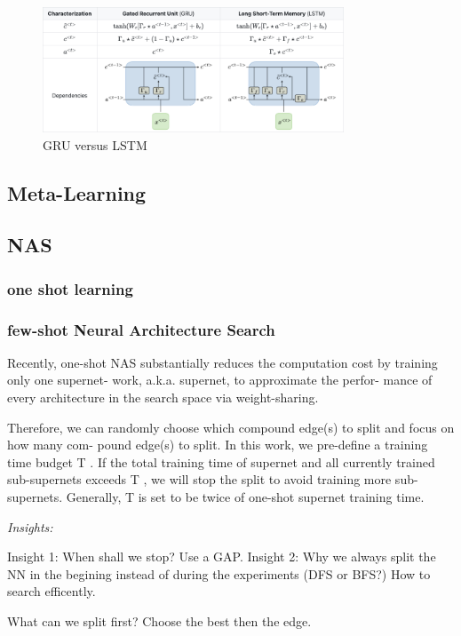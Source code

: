 \documentclass[UTF8]{article}
\begin{document}
\begin{figure}[htbp]
\caption{GRU versus LSTM}
\centering
\includegraphics[width=0.8\textwidth]{stanford.edu__shervine_teaching_cs-230_cheatsheet-recurrent-neural-networks-2.png}
\end{figure}

\subsection{Meta-Learning}
\subsection{NAS}
\subsubsection{one shot learning}

\subsubsection{few-shot Neural Architecture Search}
Recently, one-shot NAS substantially reduces the computation cost by training only one supernet- work, a.k.a. supernet, to approximate the perfor- mance of every architecture in the search space via weight-sharing.

Therefore, we can randomly choose which compound edge(s) to split and focus on how many com- pound edge(s) to split. In this work, we pre-define a training time budget T . If the total training time of supernet and all currently trained sub-supernets exceeds T , we will stop the split to avoid training more sub-supernets. Generally, T is set to be twice of one-shot supernet training time. 

\emph{Insights:}

Insight 1: When shall we stop? Use a GAP.
Insight 2: Why we always split the NN in the begining instead of during the experiments (DFS or BFS?) How to search efficently.

What can we split first? Choose the best then the edge.
\end{document}
